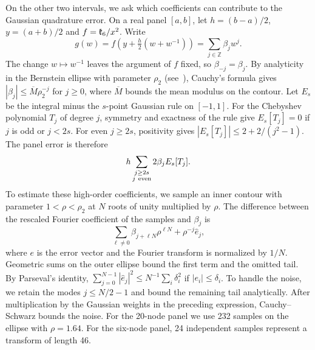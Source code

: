 On the other two intervals, we ask which coefficients can contribute to the Gaussian quadrature
error. On a real panel $[a,b]$, let $h=(b-a)/2$, $y=(a+b)/2$ and $f=\mathfrak{k}_6/x^2$. Write
\[
 g(w)=f\!\left(y+\tfrac h2(w+w^{-1})\right)
      =\sum_{j\in\mathbb Z}\beta_jw^j .
\]
The change $w\mapsto w^{-1}$ leaves the argument of $f$ fixed, so $\beta_{-j}=\beta_j$. By
analyticity in the Bernstein ellipse with parameter $\rho_2$ (see~\cite{trefethen}), Cauchy's
formula gives $|\beta_j|\le\overline M\rho_2^{-j}$ for $j\ge0$, where $\overline M$ bounds the
mean modulus on the contour. Let $E_s$ be the integral minus the $s$-point Gaussian rule on
$[-1,1]$. For the Chebyshev polynomial $T_j$ of degree $j$, symmetry and exactness of the rule
give $E_s[T_j]=0$ if $j$ is odd or $j<2s$. For even $j\ge2s$, positivity gives
$|E_s[T_j]|\le2+2/(j^2-1)$. The panel error is therefore
\[
 h\sum_{\substack{j\ge2s\\j\ {\rm even}}}2\beta_j E_s[T_j].
\]
To estimate these high-order coefficients, we sample an inner contour with parameter
$1<\rho<\rho_2$ at $N$ roots of unity multiplied by $\rho$. The difference between the rescaled
Fourier coefficient of the samples and $\beta_j$ is
\[
 \sum_{\ell\ne0}\beta_{j+\ell N}\rho^{\ell N}+\rho^{-j}\widehat e_j ,
\]
where $e$ is the error vector and the Fourier transform is normalized by $1/N$. Geometric sums on
the outer ellipse bound the first term and the omitted tail. By Parseval's identity,
$\sum_{j=0}^{N-1}|\widehat e_j|^2\le N^{-1}\sum_i\delta_i^2$ if $|e_i|\le\delta_i$. To handle the
noise, we retain the modes $j\le N/2-1$ and bound the remaining tail analytically. After
multiplication by the Gaussian weights in the preceding expression, Cauchy--Schwarz bounds the
noise. For the 20-node panel we use 232 samples on the ellipse with $\rho=1.64$. For the six-node
panel, 24 independent samples represent a transform of length 46.

